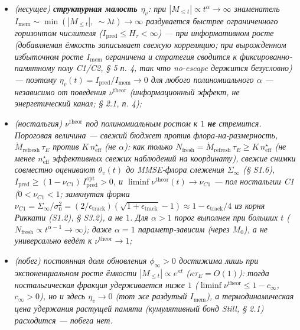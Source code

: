 \documentclass[12pt]{iopart}
\providecommand{\tightlist}{\setlength{\itemsep}{0pt}\setlength{\parskip}{0pt}}
\begin{document}
\begin{itemize}

\tightlist

\item

  \emph{(несущее) \textbf{структурная малость \(\eta_v\)}: при \(|M_{\le t}| \propto t^\alpha \to \infty\) знаменатель \(I_{\text{mem}} \sim \min(|M_{\le t}|,\ \sim\lambda t) \to \infty\) раздувается быстрее ограниченного горизонтом числителя (\(I_{\text{pred}} \le H_\tau < \infty\)) --- \emph{при информативном росте} (добавляемая ёмкость записывает свежую корреляцию; при вырожденном \emph{избыточном} росте \(I_{\text{mem}}\) ограничена и стратегия сводится к фиксированно-памятному полу C1/C2, § 5 п. 4, так что no-escape держится безусловно) --- поэтому \(\eta_v(t) = I_{\text{pred}}/I_{\text{mem}} \to 0\) для любого полиномиального \(\alpha\) --- независимо от поведения \(\nu^{\text{theor}}\) (информационный эффект, не энергетический канал; § 2.1, п. 4);}

\item

  \emph{(ностальгия) \(\nu^{\text{theor}}\) под полиномиальным ростом к \(1\) \textbf{не} стремится. Пороговая величина --- свежий бюджет против флора-на-размерность, \(\dot M_{\text{refresh}}\,\tau_E\) против \(K\,n_{\text{eff}}^\star\) (не \(\alpha\)): как только \(N_{\text{fresh}} = \dot M_{\text{refresh}}\,\tau_E \ge K\,n_{\text{eff}}^\star\) (не менее \(n_{\text{eff}}^\star\) эффективных свежих наблюдений на координату), свежие снимки \emph{совместно} оценивают \(\theta_v(t)\) до MMSE-флора слежения \(\Sigma_\infty\) (§ S1.6), \(I_{\text{pred}} \ge (1-\nu_{C1})\,I_{\text{pred}}^{\text{opt}} > 0\), и \(\liminf\nu^{\text{theor}}(t) \to \nu_{C1}\) --- пол ностальгии C1 (\(0 < \nu_{C1} < 1\); замкнутая форма \(\nu_{C1} = \Sigma_\infty/\sigma_0^2 = (2/\epsilon_{\text{track}})(\sqrt{1+\epsilon_{\text{track}}}-1) \approx 1 - \epsilon_{\text{track}}/4\) из корня Риккати (S1.2), § S3.2), а не \(1\). Для \(\alpha > 1\) порог выполнен при больших \(t\) (\(N_{\text{fresh}} \propto t^{\alpha-1} \to \infty\)); даже \(\alpha = 1\) параметр-зависим (через \(M_0\)), а не универсально ведёт к \(\nu^{\text{theor}} \to 1\);}

\item

  \emph{(побег) постоянная доля обновления \(\phi_\infty > 0\) достижима лишь при экспоненциальном росте ёмкости \(|M_{\le t}| \propto e^{\kappa t}\) (\(\kappa\tau_E = O(1)\)): тогда ностальгическая фракция удерживается ниже \(1\) (\(\liminf\nu^{\text{theor}} \le 1 - c_\infty\), \(c_\infty > 0\)), но и здесь \(\eta_v \to 0\) (тот же раздутый \(I_{\text{mem}}\)), а термодинамическая цена удержания растущей памяти (кумулятивный бонд Still, § 2.1) расходится --- побега нет.}

\end{itemize}
\end{document}
